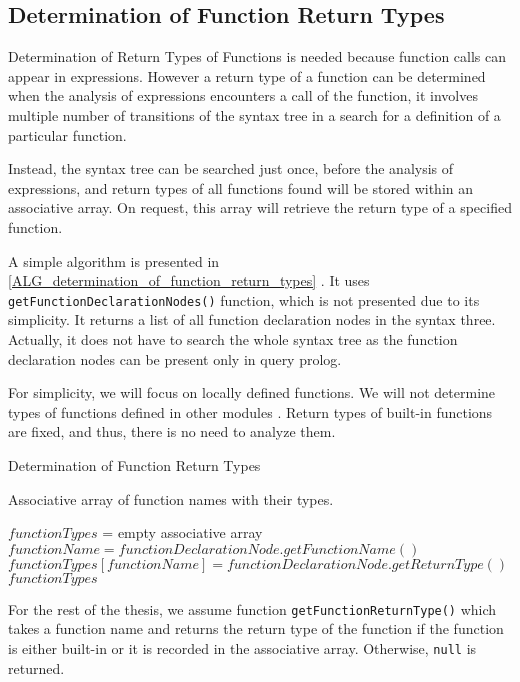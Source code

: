 \subsection{Determination of Function Return Types}
Determination of Return Types of Functions is needed because function calls can appear in expressions. However a return type of a function can be determined when the analysis of expressions encounters a call of the function, it involves multiple number of transitions of the syntax tree in a search for a definition of a particular function.

Instead, the syntax tree can be searched just once, before the analysis of expressions, and return types of all functions found will be stored within an associative array. On request, this array will retrieve the return type of a specified function.

A simple algorithm is presented in \ref{ALG_determination_of_function_return_types} . It uses \texttt{getFunctionDeclarationNodes()} function, which is not presented due to its simplicity. It returns a list of all function declaration nodes in the syntax three. Actually, it does not have to search the whole syntax tree as the function declaration nodes can be present only in query prolog. 

For simplicity, we will focus on locally defined functions. We will not determine types of functions defined in other modules . Return types of built-in functions are fixed, and thus, there is no need to analyze them.

\begin{algorithm}
\caption{Determination of Function Return Types}
\label{ALG_determination_of_function_return_types}
\begin{algorithmic}[1]
\ENSURE Associative array of function names with their types.

\STATE $functionTypes$ = empty associative array
    \STATE $functionName = functionDeclarationNode.getFunctionName()$
    \STATE $functionTypes[functionName] = functionDeclarationNode.getReturnType()$
\ENDFOR
\RETURN $functionTypes$
\end{algorithmic}
\end{algorithm}

For the rest of the thesis, we assume function \texttt{getFunctionReturnType()} which takes a function name and returns the return type of the function if the function is either built-in or it is recorded in the associative array. Otherwise, \texttt{null} is returned.

